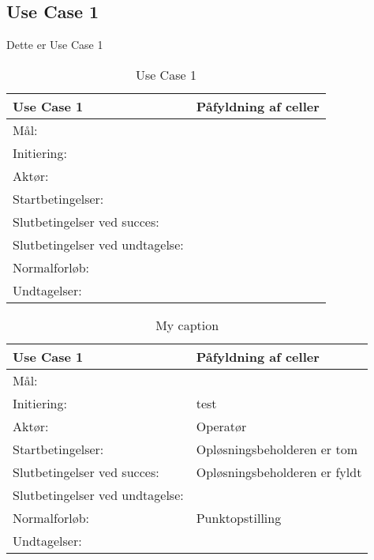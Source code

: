 \subsection{Use Case 1}
Dette er Use Case 1


\begin{table}[]
\centering
\label{my-label}
\begin{tabular}{|l|l|}
\hline
\textbf{Use Case 1  }           & \textbf{Påfyldning af celler} \\ \hline
Mål:                            &         \\ \hline
Initiering:                     &                            \\ \hline
Aktør:                          &                            \\ \hline
Startbetingelser:               &                            \\ \hline
Slutbetingelser ved succes:     &                            \\ \hline
Slutbetingelser ved undtagelse: &                            \\ \hline
Normalforløb:                   &                            \\ \hline
Undtagelser:                    &                            \\ \hline
\end{tabular}
\caption{Use Case 1}
\label{tab:uc1}
\end{table}

\begin{table}[]
\centering

\begin{tabular}{|l|l|}
\hline
\textbf{Use Case 1  }           & \textbf{Påfyldning af celler }\\ \hline
Mål:                            &               \\ \hline
Initiering:                     & test	\\ \hline
Aktør:                          &   Operatør                       \\ \hline
Startbetingelser:               &    Opløsningsbeholderen er tom        \\ \hline
Slutbetingelser ved succes:     &     Opløsningsbeholderen er fyldt      \\ \hline
Slutbetingelser ved undtagelse: &                            \\ \hline
Normalforløb:                   & Punktopstilling
\\ \hline
Undtagelser:                    &                            \\ \hline
\end{tabular}

\caption{My caption}
\label{my-label}
\end{table}
